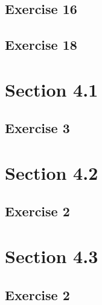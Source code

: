 \documentclass{article}
\begin{document}
\subsection{Exercise 16}
\subsection{Exercise 18}
\section{Section 4.1}
\subsection{Exercise 3}
\section{Section 4.2}
\subsection{Exercise 2}
\section{Section 4.3}
\subsection{Exercise 2}
\end{document}
